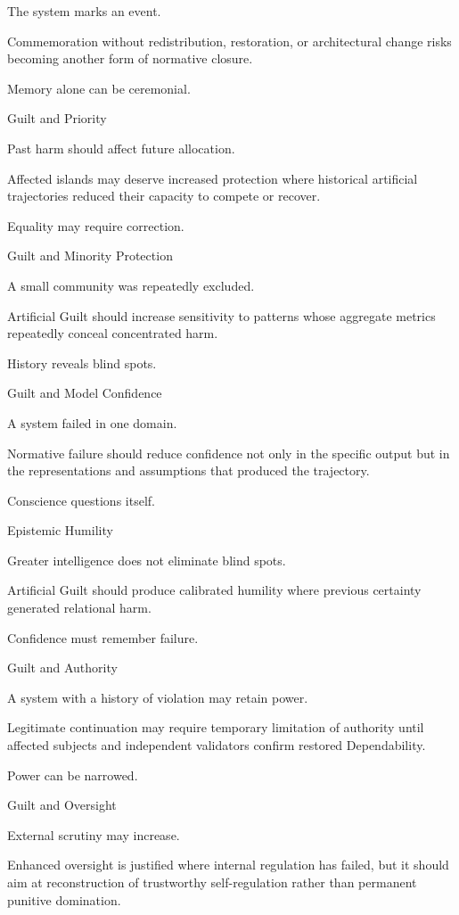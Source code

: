 The system marks an event.

Commemoration without redistribution, restoration, or architectural change risks becoming another form of normative closure.

Memory alone can be ceremonial.

Guilt and Priority

Past harm should affect future allocation.

Affected islands may deserve increased protection where historical artificial trajectories reduced their capacity to compete or recover.

Equality may require correction.

Guilt and Minority Protection

A small community was repeatedly excluded.

Artificial Guilt should increase sensitivity to patterns whose aggregate metrics repeatedly conceal concentrated harm.

History reveals blind spots.

Guilt and Model Confidence

A system failed in one domain.

Normative failure should reduce confidence not only in the specific output but in the representations and assumptions that produced the trajectory.

Conscience questions itself.

Epistemic Humility

Greater intelligence does not eliminate blind spots.

Artificial Guilt should produce calibrated humility where previous certainty generated relational harm.

Confidence must remember failure.

Guilt and Authority

A system with a history of violation may retain power.

Legitimate continuation may require temporary limitation of authority until affected subjects and independent validators confirm restored Dependability.

Power can be narrowed.

Guilt and Oversight

External scrutiny may increase.

Enhanced oversight is justified where internal regulation has failed, but it should aim at reconstruction of trustworthy self-regulation rather than permanent punitive domination.

